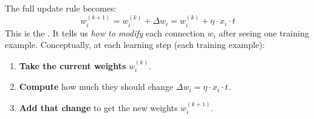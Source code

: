 The full update rule becomes:
\begin{equation}\label{eq:hebbian-weight-update}
    w_{i}^{(k+1)} = w_i^{(k)} + \Delta w_i = w_i^{(k)} + \eta \cdot x_i \cdot t
\end{equation}
This is the . It tells us \emph{how to modify} each connection $w_{i}$ after seeing one training example. Conceptually, at each learning step (each training example):
\begin{enumerate}
    \item \textbf{Take the current weights} $w_{i}^{(k)}$.
    \item \textbf{Compute} how much they should change $\Delta w_{i} = \eta \cdot x_{i} \cdot t$.
    \item \textbf{Add that change} to get the new weights $w_{i}^{(k+1)}$.
\end{enumerate}

